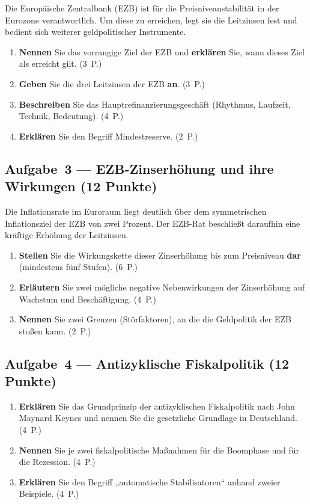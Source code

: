 \documentclass[11pt, a4paper]{article}
\begin{document}
Die Europäische Zentralbank (EZB) ist für die Preisniveaustabilität in der Eurozone
verantwortlich. Um diese zu erreichen, legt sie die Leitzinsen fest und bedient sich
weiterer geldpolitischer Instrumente.

\begin{enumerate}[label=(\alph*)]
  \item \textbf{Nennen} Sie das vorrangige Ziel der EZB und \textbf{erklären} Sie, wann
    dieses Ziel als erreicht gilt. \hfill (3~P.)
  \item \textbf{Geben} Sie die drei Leitzinsen der EZB \textbf{an}. \hfill (3~P.)
  \item \textbf{Beschreiben} Sie das Hauptrefinanzierungsgeschäft (Rhythmus, Laufzeit,
    Technik, Bedeutung). \hfill (4~P.)
  \item \textbf{Erklären} Sie den Begriff Mindestreserve. \hfill (2~P.)
\end{enumerate}

\subsection*{Aufgabe~3 --- EZB-Zinserhöhung und ihre Wirkungen (12 Punkte)}

Die Inflationsrate im Euroraum liegt deutlich über dem symmetrischen Inflationsziel der
EZB von zwei Prozent.
Der EZB-Rat beschließt daraufhin eine kräftige Erhöhung der Leitzinsen.

\begin{enumerate}[label=(\alph*)]
  \item \textbf{Stellen} Sie die Wirkungskette dieser Zinserhöhung bis zum Preisniveau
    \textbf{dar} (mindestens fünf Stufen). \hfill (6~P.)
  \item \textbf{Erläutern} Sie zwei mögliche negative Nebenwirkungen der Zinserhöhung auf
    Wachstum und Beschäftigung. \hfill (4~P.)
  \item \textbf{Nennen} Sie zwei Grenzen (Störfaktoren), an die die Geldpolitik der EZB
    stoßen kann. \hfill (2~P.)
\end{enumerate}

\subsection*{Aufgabe~4 --- Antizyklische Fiskalpolitik (12 Punkte)}

\begin{enumerate}[label=(\alph*)]
  \item \textbf{Erklären} Sie das Grundprinzip der antizyklischen Fiskalpolitik nach
    John Maynard Keynes und nennen Sie die gesetzliche Grundlage in Deutschland. \hfill (4~P.)
  \item \textbf{Nennen} Sie je zwei fiskalpolitische Maßnahmen für die Boomphase und für
    die Rezession. \hfill (4~P.)
  \item \textbf{Erklären} Sie den Begriff „automatische Stabilisatoren`` anhand zweier
    Beispiele. \hfill (4~P.)
\end{enumerate}
\end{document}
